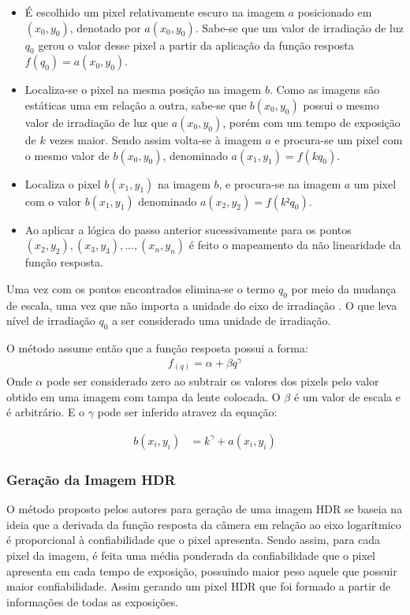 \begin{itemize}
\item É escolhido um pixel relativamente escuro na imagem $a$ posicionado em $(x_{0}, y_{0})$, denotado por $a(x_{0},y_{0})$. Sabe-se que um valor de irradiação de luz $q_{0}$ gerou o valor desse pixel a partir da aplicação da função resposta $f(q_{0}) = a(x_{0}, y_{0})$. 
\item Localiza-se o pixel na mesma posição na imagem $b$. Como as imagens são estáticas uma em relação a outra, sabe-se que $b(x_{0}, y_{0})$ possui o mesmo valor de irradiação de luz que $a(x_{0}, y_{0})$, porém com um tempo de exposição de $k$ vezes maior. Sendo assim volta-se à imagem $a$ e procura-se um pixel com o mesmo valor de $b(x_{0}, y_{0})$, denominado $a(x_{1}, y_{1}) = f(kq_{0})$.
\item Localiza o pixel $b(x_{1},y_{1})$ na imagem $b$, e procura-se na imagem $a$ um pixel com o valor $b(x_1,y_1)$ denominado $a(x_2, y_2) = f(k² q_0)$.
\item Ao aplicar a lógica do passo anterior sucessivamente para os pontos $(x_2, y_2), (x_3, y_3), ... , (x_n, y_n)$ é feito o mapeamento da não linearidade da função resposta.
\end{itemize}
Uma vez com os pontos encontrados elimina-se o termo $q_{0}$ por meio da mudança de escala, uma vez que não importa a unidade do eixo de irradiação \cite{mann}. O que leva nível de irradiação $q_{0}$ a ser considerado uma unidade de irradiação.

O método assume então que a função resposta possui a forma:
\begin{align} \label{eqMannTotal}
	f_{(q)} = \alpha + \beta q ^ \gamma
\end{align}
 Onde $\alpha$ pode ser considerado zero ao subtrair os valores dos pixels pelo valor obtido em uma imagem com tampa da lente colocada. O $\beta$ é um valor de escala e é arbitrário. E o $\gamma$ pode ser inferido atravez da equação:
	
\begin{align} \label{eqMannGama}
          b(x_{i},y_{i}) &= k^\gamma + a(x_{i},y_{i})
\end{align}


\subsubsection{Geração da Imagem HDR} \label{metodoMannGeracao}

O método proposto pelos autores para geração de uma imagem HDR se baseia na ideia que a derivada da função resposta da câmera em relação ao eixo logarítmico é proporcional à confiabilidade que o pixel apresenta. Sendo assim, para cada pixel da imagem, é feita uma média ponderada da confiabilidade que o pixel apresenta em cada tempo de exposição, possuindo maior peso aquele que possuir maior confiabilidade. Assim gerando um pixel HDR que foi formado a partir de informações de todas as exposições.

